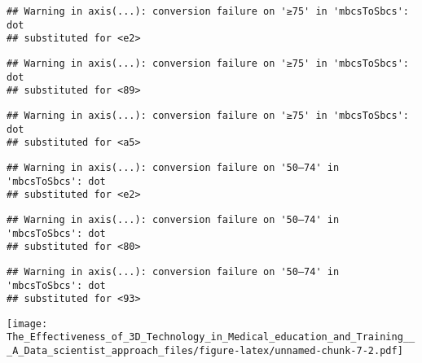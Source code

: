 \documentclass[]{article}
\begin{document}
\begin{verbatim}
## Warning in axis(...): conversion failure on '≥75' in 'mbcsToSbcs': dot
## substituted for <e2>
\end{verbatim}

\begin{verbatim}
## Warning in axis(...): conversion failure on '≥75' in 'mbcsToSbcs': dot
## substituted for <89>
\end{verbatim}

\begin{verbatim}
## Warning in axis(...): conversion failure on '≥75' in 'mbcsToSbcs': dot
## substituted for <a5>
\end{verbatim}

\begin{verbatim}
## Warning in axis(...): conversion failure on '50–74' in 'mbcsToSbcs': dot
## substituted for <e2>
\end{verbatim}

\begin{verbatim}
## Warning in axis(...): conversion failure on '50–74' in 'mbcsToSbcs': dot
## substituted for <80>
\end{verbatim}

\begin{verbatim}
## Warning in axis(...): conversion failure on '50–74' in 'mbcsToSbcs': dot
## substituted for <93>
\end{verbatim}

\texttt{[image: The\_Effectiveness\_of\_3D\_Technology\_in\_Medical\_education\_and\_Training\_\_\_A\_Data\_scientist\_approach\_files/figure-latex/unnamed-chunk-7-2.pdf]}
\end{document}
